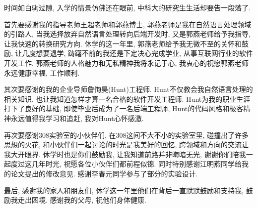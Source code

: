 
\begin{acknowledgements}

时间如白驹过隙, 入学的情景仿佛还在眼前, 中科大的研究生生活却要告一段落了.

首先要感谢我的指导老师王超老师和郭燕博士, 郭燕老师是我在自然语言处理领域的引路人, 当我选择放弃自然语言处理转向后端开发时, 
又是郭燕老师给予我指导, 让我快速的转换研究方向. 休学的这一年里, 郭燕老师给予我无微不至的关怀和鼓励, 让几度想要退学, 踌躇不前的我还是下定决心完成学业, 从事互联网行业的软件开发工作.
郭燕老师的人格魅力和无私精神我将永记于心, 我衷心的祝愿郭燕老师永远健康幸福, 工作顺利.

其次要感谢的我的企业导师詹恂昊(Hunt)工程师. Hunt不仅教会我自然语言处理的相关知识, 也让我知道怎样才算一名合格的软件开发工程师.
Hunt为我的职业生涯打下了良好的基础, 即使毕业后成为了一名后端工程师, Hunt的代码风格和极客精神永远值得我学习和追赶, 我对Hunt心怀感激.

再次要感谢308实验室的小伙伴们, 在308这间不大不小的实验室里, 碰撞出了许多思想的火花, 和小伙伴们一起讨论的时光是我美好的回忆, 跨领域和方向的交流让我大开眼界.
休学时也是你们鼓励我, 让我知道前路并非晦暗无光, 谢谢你们陪我一起度过这几年时光, 祝愿各位小伙伴们都前程似锦. 同时特别感谢江明燕同学给我的论文提出的修改意见.
感谢李春元同学参与了部分的实验设计.

最后, 感谢我的家人和朋友们, 休学这一年里他们在背后一直默默鼓励和支持我, 鼓励我走出困境. 感谢我的父母, 祝他们身体健康.

\end{acknowledgements}
